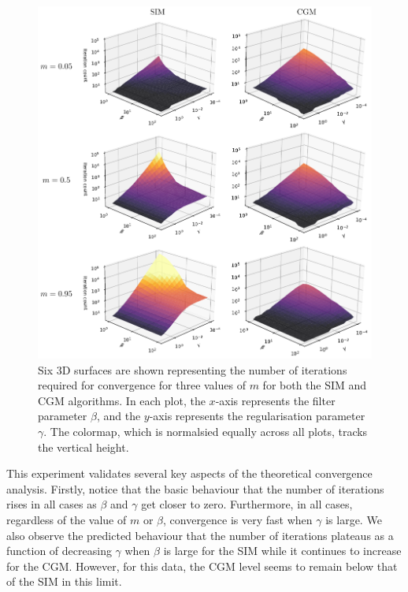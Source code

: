\begin{figure}[t]
    \begin{center} 
    \includegraphics[width=\linewidth]{Figures/3d_iterations.pdf}
    \end{center}
    \caption{\small{Six 3D surfaces are shown representing the number of iterations required for convergence for three values of $m$ for both the SIM and CGM algorithms. In each plot, the $x$-axis represents the filter parameter $\beta$, and the $y$-axis represents the regularisation parameter $\gamma$. The colormap, which is normalsied equally across all plots, tracks the vertical height. }}
    \label{fig:3d_iteration_plots}
\end{figure}

This experiment validates several key aspects of the theoretical convergence analysis. Firstly, notice that the basic behaviour that the number of iterations rises in all cases as $\beta$ and $\gamma$ get closer to zero. Furthermore, in all cases, regardless of the value of $m$ or $\beta$, convergence is very fast when $\gamma$ is large. We also observe the predicted behaviour that the number of iterations plateaus as a function of decreasing $\gamma$ when $\beta$ is large for the SIM while it continues to increase for the CGM. However, for this data, the CGM level seems to remain below that of the SIM in this limit. 

